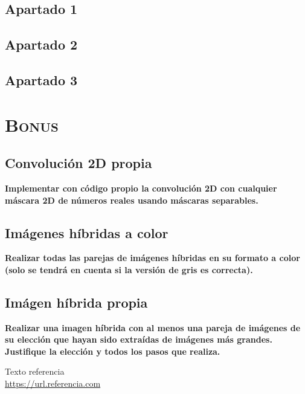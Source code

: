 \documentclass[11pt,a4paper]{article}
\begin{document}
\subsection{Apartado 1}

\subsection{Apartado 2}

\subsection{Apartado 3}

\newpage

\section{\textsc{Bonus}}

\subsection{Convolución 2D propia}

\noindent \textbf{Implementar con código propio la convolución 2D con cualquier máscara 2D de números reales usando
máscaras separables.}

\subsection{Imágenes híbridas a color}

\noindent \textbf{Realizar todas las parejas de imágenes híbridas en su formato a color (solo se tendrá en cuenta
si la versión de gris es correcta).}

\subsection{Imágen híbrida propia}

\noindent \textbf{Realizar una imagen híbrida con al menos una pareja de imágenes de su elección que hayan
sido extraídas de imágenes más grandes. Justifique la elección y todos los pasos que realiza.}

\newpage

\begin{thebibliography}{5}

Texto referencia
\\\url{https://url.referencia.com}

\end{thebibliography}
\end{document}
